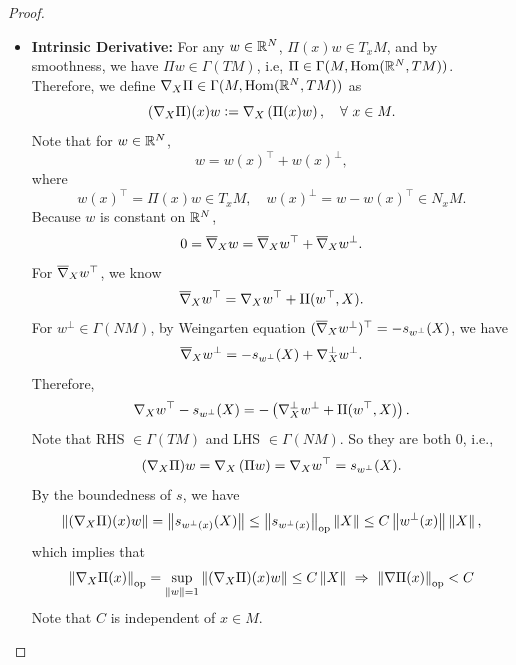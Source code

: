 \begin{proof}
\begin{itemize}
        \item \textbf{Intrinsic Derivative:} For any $w \in \mathbb{R}^N$, $\Pi(x)w \in T_xM$, and by smoothness, we have $\Pi w \in \Gamma(TM)$, i.e, $\Pi \in \Gamma(M,\operatorname{Hom}(\mathbb{R}^N,TM))$. Therefore, we define $\nabla_X\Pi \in \Gamma(M,\operatorname{Hom}(\mathbb{R}^N,TM))$ as
        \begin{equation*}
            (\nabla_X\Pi)(x)w \vcentcolon= \nabla_X\left(\Pi(x)w\right),\quad \forall~ x \in M.
        \end{equation*}
        Note that for $w \in \mathbb{R}^N$,
        \begin{equation*}
            w = w(x)^\top + w(x)^\perp,
        \end{equation*}
        where
        \begin{equation*}
            w(x)^\top = \Pi(x)w \in T_xM,\quad w(x)^\perp = w - w(x)^\top \in N_xM.
        \end{equation*}
        Because $w$ is constant on $\mathbb{R}^N$,
        \begin{equation*}
            0 = \overline{\nabla}_X w =  \overline{\nabla}_X w^\top  + \overline{\nabla}_X w^\perp.
        \end{equation*}
        For $\overline{\nabla}_X w^\top$, we know
        \begin{equation*}
            \overline{\nabla}_X w^\top = \nabla_X w^\top + \mathrm{II}(w^\top,X).
        \end{equation*}
        For $w^\perp \in \Gamma(NM)$, by Weingarten equation $(\overline{\nabla}_X w^\perp)^\top = - s_{w^\perp}(X)$, we have
        \begin{equation*}
            \overline{\nabla}_X w^\perp = -s_{w^\perp}(X) + \nabla_X^\perp w^\perp.
        \end{equation*}
        Therefore, 
        \begin{equation*}
            \nabla_X w^\top -s_{w^\perp}(X) = - \left(\nabla_X^\perp w^\perp + \mathrm{II}(w^\top,X)\right).
        \end{equation*}
        Note that RHS $\in \Gamma(TM)$ and LHS $\in \Gamma(NM)$. So they are both $0$, i.e.,
        \begin{equation*}
            (\nabla_X\Pi)w= \nabla_X\left(\Pi w\right) = \nabla_X w^\top = s_{w^\perp}(X).
        \end{equation*}
        By the boundedness of $s$, we have
        \begin{equation*}
            \left\lVert(\nabla_X\Pi)(x)w\right\lVert = \left\lVert s_{w^\perp(x)}(X)\right\lVert \leq \left\lVert s_{w^\perp(x)}\right\lVert_{\operatorname{op}}\left\lVert X\right\lVert \leq C\left\lVert w^\perp(x)\right\lVert\left\lVert X\right\lVert,
        \end{equation*}
        which implies that
        \begin{equation*}
            \left\lVert\nabla_X \Pi(x)\right\lVert_{\operatorname{op}} = \sup_{\left\lVert w\right\lVert = 1}\left\lVert(\nabla_X\Pi)(x)w\right\lVert \leq C\left\lVert X\right\lVert~\Rightarrow~\left\lVert\nabla \Pi(x)\right\lVert_{\operatorname{op}} < C
        \end{equation*}
        Note that $C$ is independent of $x \in M$.


\end{itemize}
\end{proof}
